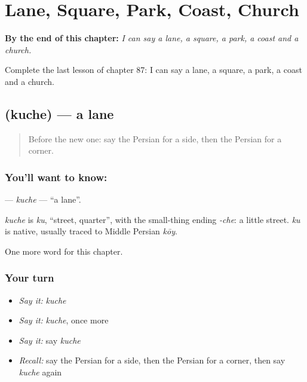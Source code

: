 
\chapter{Lane, Square, Park, Coast, Church}
\label{ch:fa-lane-square-park-coast-church}

\begin{chapteropening}
\textbf{By the end of this chapter:} \emph{I can say a lane, a square, a park, a coast and a church.}

Complete the last lesson of chapter 87: I can say a lane, a square, a park, a coast and a church.
\end{chapteropening}

\section[\texorpdfstring{\fa{کوچه} (kuche)}{کوچه (kuche)}]{ (kuche) — a lane}

\label{lesson:FA-C87-kuche}



\begin{quote}
Before the new one: say the Persian for a side, then the Persian for a corner.
\end{quote}

\subsection*{You'll want to know: }
\textbf{} — \emph{kuche} — \textquotedblleft{}a lane\textquotedblright{}.

\begin{cousinweb}
\emph{kuche} is \emph{ku}, \textquotedblleft{}street, quarter\textquotedblright{}, with the small-thing ending \emph{-che}: a little street. \emph{ku} is native, usually traced to Middle Persian \emph{kōy}.
\end{cousinweb}

\begin{grammarlens}[title={What you've built}]
One more word for this chapter.
\end{grammarlens}

\subsection*{Your turn}
\begin{itemize}
\raggedright
  \item \emph{Say it:} \emph{kuche}
  \item \emph{Say it:} \emph{kuche}, once more
  \item \emph{Say it:} say \emph{kuche}
  \item \emph{Recall:} say the Persian for a side, then the Persian for a corner, then say \emph{kuche} again
\end{itemize}

